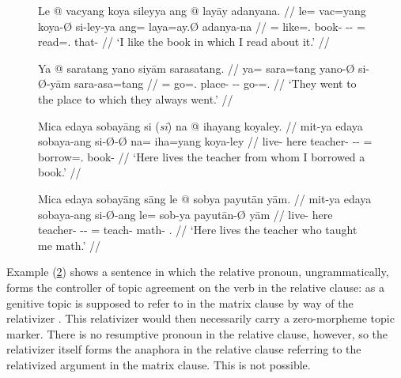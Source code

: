 \begin{figure}
\pex\label{ex:relcompl}
\a\begingl[glspace=.33em]
	\gla Le @ vacyang koya sileyya ang @ layāy adanyana. //
	\glb le= vac=yang koya-Ø si-ley-ya ang= laya=ay.Ø adanya-na //
	\glc \PatTI{}= like=\Fsg{}.\Aarg{} book-\Top{} \Rel{}-\PargI{}-\Loc{}
	\AgtT{}= read=\Fsg{}.\Top{} that-\Gen{} //
	\glft `I like the book in which I read about it.' //
\endgl

\a\label{ex:reldat}\begingl
	\gla Ya @ saratang yano siyām sarasatang. //
	\glb ya= sara=tang yano-Ø si-Ø-yām sara-asa=tang //
	\glc \LocT{}= go=\TplM{}.\Aarg{} place-\Top{} \Rel{}-\Loc{}-\Dat{} 
		go-\Hab{}=\TplM{}.\Aarg{} //
	\glft `They went to the place to which they always went.' //
\endgl
\xe
\end{figure}

\begin{figure}
\ex\label{ex:reltop}
\ljudge* \begingl
	\gla Mica edaya sobayāng {si \textup{(\ques{}\textit{sī})}} na @ ihayang 
		koyaley. //
	\glb mit-ya edaya sobaya-ang si-Ø-Ø na= iha=yang koya-ley //
	\glc live-\TsgM{} here teacher-\Aarg{} \Rel{}-\Aarg{}-\Top{} \GenT{}= 
		borrow=\Fsg{}.\Aarg{} book-\PargI{} //
% 
	\glft `Here lives the teacher from whom I borrowed a book.' //
\endgl
\xe
\end{figure}

\begin{figure}
\ex\label{ex:relagt}
\ljudge* \begingl
	\gla Mica edaya sobayāng sāng le @ sobya payutān yām. //
	\glb mit-ya edaya sobaya-ang si-Ø-ang le= sob-ya payutān-Ø yām //
	\glc live-\TsgM{} here teacher-\Aarg{} \Rel{}-\Aarg{}-\Aarg{} \PatTI{}= 
		teach-\TsgM{} math-\Top{} \Fsg{}.\Dat{} //
% 
	\glft `Here lives the teacher who taught me math.' //
\endgl
\xe
\end{figure}

Example (\ref{ex:reltop}) shows a sentence in which the relative pronoun, 
ungrammatically, forms the controller of topic agreement on the verb in the 
relative clause:  as a genitive topic is supposed to refer to 
 in the matrix clause by way of the
relativizer . This relativizer would then necessarily carry a
zero-morpheme topic marker. There is no resumptive pronoun in the relative
clause, however, so the relativizer itself forms the anaphora in the relative
clause referring to the relativized argument in the matrix clause. This is not
possible.

